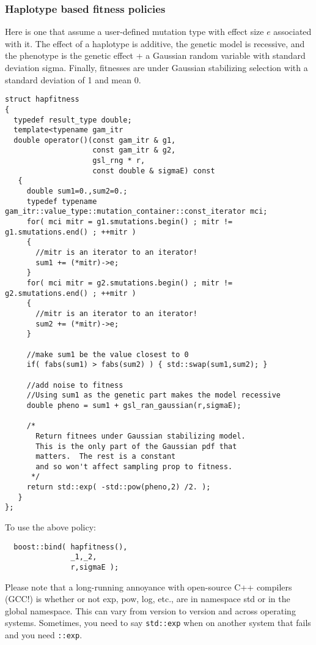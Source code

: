 \documentclass{article}
\begin{document}
\subsubsection{Haplotype based fitness policies}
Here is one that assume a user-defined mutation type with effect size $e$ associated with it.  The effect of a haplotype is additive, the genetic model is recessive, and the phenotype is the genetic effect + a Gaussian random variable with standard deviation sigma.  Finally, fitnesses are under Gaussian stabilizing selection with a standard deviation of 1 and mean 0.

\begin{lstlisting}
struct hapfitness
{
  typedef result_type double;
  template<typename gam_itr
  double operator()(const gam_itr & g1,
                    const gam_itr & g2,
                    gsl_rng * r,
                    const double & sigmaE) const
   {
     double sum1=0.,sum2=0.;
     typedef typename gam_itr::value_type::mutation_container::const_iterator mci;
     for( mci mitr = g1.smutations.begin() ; mitr != g1.smutations.end() ; ++mitr )
     {
       //mitr is an iterator to an iterator!
       sum1 += (*mitr)->e;
     }
     for( mci mitr = g2.smutations.begin() ; mitr != g2.smutations.end() ; ++mitr )
     {
       //mitr is an iterator to an iterator!
       sum2 += (*mitr)->e;
     }

     //make sum1 be the value closest to 0
     if( fabs(sum1) > fabs(sum2) ) { std::swap(sum1,sum2); }

     //add noise to fitness
     //Using sum1 as the genetic part makes the model recessive
     double pheno = sum1 + gsl_ran_gaussian(r,sigmaE);
     
     /*
       Return fitnees under Gaussian stabilizing model.
       This is the only part of the Gaussian pdf that
       matters.  The rest is a constant
       and so won't affect sampling prop to fitness.
      */
     return std::exp( -std::pow(pheno,2) /2. );
   }
};
\end{lstlisting}

To use the above policy:
\begin{lstlisting}
  boost::bind( hapfitness(),
               _1,_2,
               r,sigmaE );
\end{lstlisting}

Please note that a long-running annoyance with open-source C++ compilers (GCC!) is whether or not exp, pow, log, etc., are in namespace std or in the global namespace.  This can vary from version to version and across operating systems.  Sometimes, you need to say \texttt{std::exp} when on another system that fails and you need \texttt{::exp}.
\end{document}
